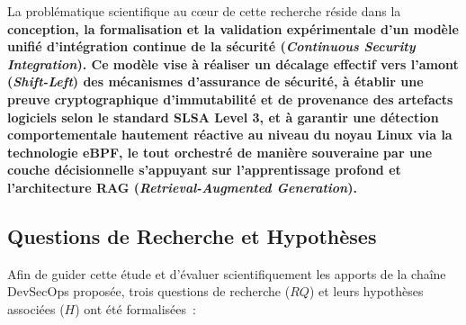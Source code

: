 La problématique scientifique au cœur de cette recherche réside dans la \textbf{conception, la formalisation et la validation expérimentale d'un modèle unifié d'intégration continue de la sécurité (\textit{Continuous Security Integration}). Ce modèle vise à réaliser un décalage effectif vers l'amont (\textit{Shift-Left}) des mécanismes d'assurance de sécurité, à établir une preuve cryptographique d'immutabilité et de provenance des artefacts logiciels selon le standard SLSA Level 3, et à garantir une détection comportementale hautement réactive au niveau du noyau Linux via la technologie eBPF, le tout orchestré de manière souveraine par une couche décisionnelle s'appuyant sur l'apprentissage profond et l'architecture RAG (\textit{Retrieval-Augmented Generation}).}

\subsection{Questions de Recherche et Hypothèses}

Afin de guider cette étude et d'évaluer scientifiquement les apports de la chaîne DevSecOps proposée, trois questions de recherche ($RQ$) et leurs hypothèses associées ($H$) ont été formalisées~:

